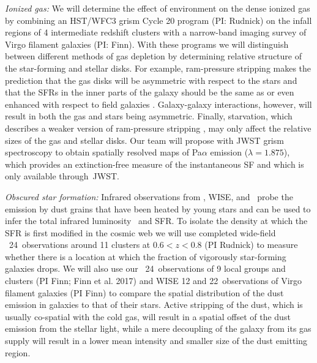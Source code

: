 \documentclass[11pt]{article}
\begin{document}
\textit{Ionized gas:} We will determine the effect of environment on the dense ionized
gas by combining an HST/WFC3 grism Cycle 20 program
(PI: Rudnick) on the infall regions of 4 intermediate redshift
clusters with a narrow-band imaging survey of Virgo filament galaxies (PI: Finn).  With these programs
we will distinguish between different methods of gas depletion by
determining relative structure of the star-forming and stellar disks.
For example, ram-pressure stripping makes the prediction that the gas
disks will be asymmetric \citep[e.g.][]{Quilis00,Crowl05} with respect
to the stars and that the SFRs in the inner parts of the galaxy should
be the same as or even enhanced with respect to field galaxies
\citep{Koopmann04,Weinmann10}.  Galaxy-galaxy interactions, however,
will result in both the gas and stars being asymmetric.  Finally,
starvation, which describes a weaker version of ram-pressure stripping
\citep[e.g.][]{Larson80}, may only affect the relative sizes of the
gas and stellar disks.  Our team will propose with JWST grism spectroscopy to obtain spatially resolved maps of Pa$\alpha$ emission ($\lambda=1.875$\micron), which provides an extinction-free measure of the instantaneous SF and which is only available through~JWST.


\textit{Obscured star formation:} Infrared observations from
\spitzer, WISE, and \herschel\ probe the emission by dust grains that have
been heated by young stars and can be used to infer the total
infrared luminosity \lir\ and SFR.  
To isolate the density at which the SFR is first modified in the cosmic web we will use completed wide-field
\spitzer\ 24\micron\ observations around 11 clusters at $0.6<z<0.8$
(PI Rudnick) to measure whether there is a location at which the
fraction of vigorously star-forming galaxies drops.  We will also use our
\spitzer\ 24\micron\ observations of 9 local groups and clusters (PI Finn; Finn et al. 2017) and WISE 12 and 22\micron\ observations of Virgo filament galaxies (PI Finn) to
compare the spatial distribution of the dust emission in galaxies to
that of their stars.  Active stripping of the dust, which is usually co-spatial with the cold gas, will
result in a spatial offset of the dust emission from the stellar
light, while a mere decoupling of the galaxy from its gas supply will
result in a lower mean intensity and smaller  size of the dust emitting region.
\end{document}
